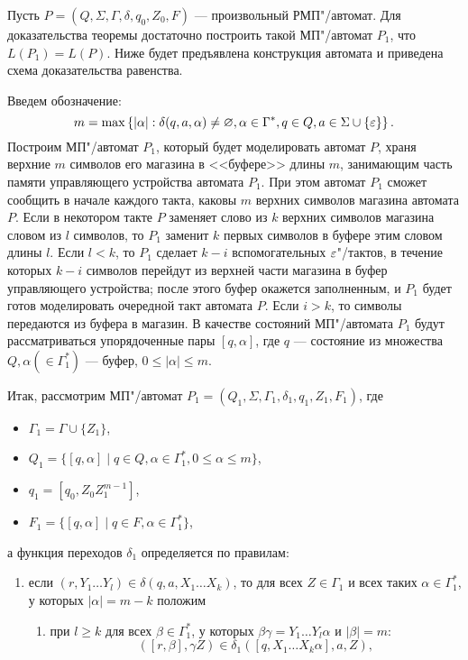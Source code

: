 \begin{myproof}
Пусть $P=(Q,\Sigma,\Gamma,\delta,q_0,Z_0,F)$ --- произвольный РМП"/автомат. Для доказательства теоремы достаточно построить такой МП"/автомат $P_1$, что $L(P_1)=L(P)$. Ниже будет предъявлена конструкция автомата и приведена схема доказательства равенства.

Введем обозначение:
\[
    m = \max\left\{|\alpha|: \delta(q,a,\alpha)\neq\varnothing, \alpha\in\Gamma^*,
                q\in Q, a\in\Sigma\cup\{\varepsilon\}\right\}.
\]
Построим МП"/автомат $P_1$, который будет моделировать автомат $P$, храня верхние $m$ символов его магазина в <<буфере>> длины $m$, занимающим часть памяти управляющего устройства автомата $P_1$. При этом автомат $P_1$ сможет сообщить в начале каждого такта, каковы $m$ верхних символов магазина автомата $P$. Если в некотором такте $P$ заменяет слово из $k$ верхних символов магазина словом из $l$ символов, то $P_1$ заменит $k$ первых символов в буфере этим словом длины $l$. Если $l<k$, то $P_1$ сделает $k-i$ вспомогательных $\varepsilon$"/тактов, в течение которых $k-i$ символов перейдут из верхней части магазина в буфер управляющего устройства; после этого буфер окажется заполненным, и $P_1$ будет готов моделировать очередной такт автомата $P$. Если $i>k$, то символы передаются из буфера в магазин. В качестве состояний МП"/автомата $P_1$ будут рассматриваться упорядоченные пары $[q,\alpha]$, где $q$ --- состояние из множества $Q, \alpha (\in\Gamma_1^*)$ --- буфер, $0\le|\alpha|\le m$.

Итак, рассмотрим МП"/автомат $P_1=(Q_1,\Sigma,\Gamma_1,\delta_1,q_1,Z_1,F_1)$, где
\begin{itemize}
\item[] $\Gamma_1 = \Gamma\cup\{Z_1\}$,
\item[] $Q_1 = \{[q,\alpha]\mid q\in Q, \alpha\in\Gamma^*_1, 0\le\alpha\le m\}$,
\item[] $q_1 = [q_0,Z_0Z_1^{m-1}]$,
\item[] $F_1 = \{[q,\alpha]\mid q\in F, \alpha\in\Gamma_1^*\}$,
\end{itemize}
а функция переходов $\delta_1$ определяется по правилам:
\begin{enumerate}
    \item если $(r,Y_1 \ldots Y_l)\in\delta(q,a,X_1\ldots X_k)$, то
    для всех $Z\in\Gamma_1$ и всех таких $\alpha\in\Gamma_1^*$,
    у которых $|\alpha|=m-k$ положим

    \begin{enumerate}
        \renewcommand{\labelenumii}{\arabic{enumi}.\arabic{enumii})}
        \item при $l\ge k$ для всех $\beta\in \Gamma_{1}^*$, у которых
        $\beta\gamma=Y_1\ldots Y_l\alpha$ и $|\beta|=m$:
        \[
        ([r,\beta],\gamma Z)\in\delta_1([q,X_1\ldots X_k\alpha],a,Z),
        \]


\end{enumerate}
\end{enumerate}
\end{myproof}
